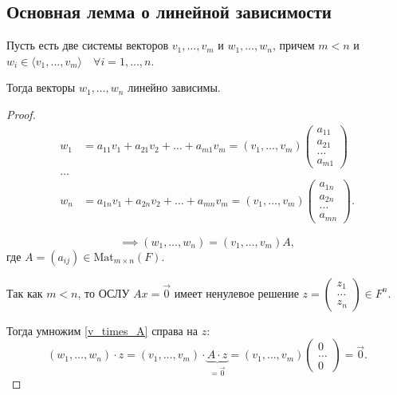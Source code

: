 \subsection{Основная лемма о линейной зависимости}

\begin{lemma}
    \label{lec11:osnovnaya_lemma_o_lin_zavisimosti}
    Пусть есть две системы векторов $v_1, \dots, v_m$ и $w_1, \dots, w_n$, причем $m < n$ и $w_i \in \langle v_1, \dots, v_m \rangle \quad \forall i = 1, \dots, n$.

    Тогда векторы $w_1, \dots, w_n$ линейно зависимы.
\end{lemma}

\begin{proof}
    \begin{align*}
        w_1 &= a_{11} v_1 + a_{21} v_2 + \dots + a_{m1} v_m = (v_1, \dots, v_m) \begin{pmatrix} a_{11} \\ a_{21} \\ \dots \\ a_{m1} \end{pmatrix} \\
        \dots\\
        w_n &= a_{1n} v_1 + a_{2n} v_2 + \dots + a_{mn} v_m = (v_1, \dots, v_m) \begin{pmatrix} a_{1n} \\ a_{2n} \\ \dots \\ a_{mn} \end{pmatrix}
    .\end{align*}

    \begin{equation*}
        \tag{$\star$}
        \label{v_times_A}
        \implies (w_1, \dots, w_n) = (v_1, \dots, v_m) A
    ,\end{equation*}
    где $A = (a_{ij}) \in \text{Mat}_{m \times n} (F)$.

    Так как $m < n$, то ОСЛУ $Ax = \overrightarrow{0}$ имеет ненулевое решение $z = \begin{pmatrix} z_1 \\ \dots \\ z_n \end{pmatrix} \in F^n$.

    Тогда умножим \eqref{v_times_A} справа на $z$:
    \begin{equation*}
        (w_1, \dots, w_n) \cdot z = (v_1, \dots, v_m) \cdot \underbrace{A \cdot z}_{= \overrightarrow{0}} = (v_1, \dots, v_m) \begin{pmatrix} 0 \\ \dots \\ 0 \end{pmatrix} = \overrightarrow{0}
    .\end{equation*}


\end{proof}
